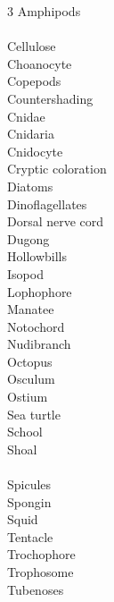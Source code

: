 
\begin{multicols}{3}
Amphipods\\
\\
Cellulose\\
Choanocyte\\
Copepods\\
Countershading\\
Cnidae\\
Cnidaria\\
Cnidocyte\\
Cryptic coloration\\
Diatoms\\
Dinoflagellates\\
Dorsal nerve cord\\
Dugong\\
Hollowbills\\
Isopod\\
Lophophore\\
Manatee\\
Notochord\\
Nudibranch\\
Octopus\\
Osculum\\
Ostium\\
Sea turtle\\
School\\
Shoal\\
\\
Spicules\\
Spongin\\
Squid\\
Tentacle\\
Trochophore\\
Trophosome\\
Tubenoses\end{multicols}
